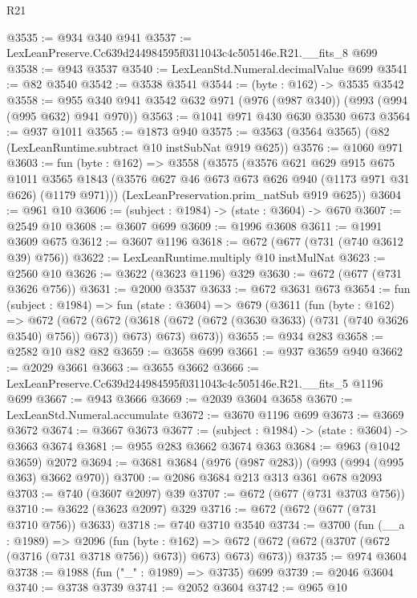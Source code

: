 \begin{lexlean}{R21}
\begin{coremodule}
@3535 := @934 @340 @941
@3537 := LexLeanPreserve.Cc639d244984595f0311043c4c505146e.R21.__fits_8 @699
@3538 := @943 @3537
@3540 := LexLeanStd.Numeral.decimalValue @699
@3541 := @82 @3540
@3542 := @3538 @3541
@3544 := (byte : @162) -> @3535 @3542
@3558 := @955 @340 @941 @3542 @632 @971 (@976 (@987 @340)) (@993 (@994 (@995 @632) @941 @970))
@3563 := @1041 @971 @430 @630 @3530 @673
@3564 := @937 @1011
@3565 := @1873 @940
@3575 := @3563 (@3564 @3565) (@82 (LexLeanRuntime.subtract @10 instSubNat @919 @625))
@3576 := @1060 @971
@3603 := fun (byte : @162) =>
  @3558
    (@3575
      (@3576
        @621
        @629
        @915
        @675
        @1011
        @3565
        @1843
        (@3576 @627 @46 @673 @673 @626 @940 (@1173 @971 @31 @626) (@1179 @971)))
      (LexLeanPreservation.prim_natSub @919 @625))
@3604 := @961 @10
@3606 := (subject : @1984) -> (state : @3604) -> @670
@3607 := @2549 @10
@3608 := @3607 @699
@3609 := @1996 @3608
@3611 := @1991 @3609 @675
@3612 := @3607 @1196
@3618 := @672 (@677 (@731 (@740 @3612 @39) @756))
@3622 := LexLeanRuntime.multiply @10 instMulNat
@3623 := @2560 @10
@3626 := @3622 (@3623 @1196) @329
@3630 := @672 (@677 (@731 @3626 @756))
@3631 := @2000 @3537
@3633 := @672 @3631 @673
@3654 := fun (subject : @1984) =>
  fun (state : @3604) =>
  @679
    (@3611
      (fun (byte : @162) =>
      @672
        (@672
          (@672 (@3618 (@672 (@672 (@3630 @3633) (@731 (@740 @3626 @3540) @756)) @673)) @673)
          @673)
        @673))
@3655 := @934 @283
@3658 := @2582 @10 @82 @82
@3659 := @3658 @699
@3661 := @937 @3659 @940
@3662 := @2029 @3661
@3663 := @3655 @3662
@3666 := LexLeanPreserve.Cc639d244984595f0311043c4c505146e.R21.__fits_5 @1196 @699
@3667 := @943 @3666
@3669 := @2039 @3604 @3658
@3670 := LexLeanStd.Numeral.accumulate
@3672 := @3670 @1196 @699
@3673 := @3669 @3672
@3674 := @3667 @3673
@3677 := (subject : @1984) -> (state : @3604) -> @3663 @3674
@3681 := @955 @283 @3662 @3674 @363
@3684 := @963 (@1042 @3659) @2072
@3694 := @3681 @3684 (@976 (@987 @283)) (@993 (@994 (@995 @363) @3662 @970))
@3700 := @2086 @3684 @213 @313 @361 @678 @2093
@3703 := @740 (@3607 @2097) @39
@3707 := @672 (@677 (@731 @3703 @756))
@3710 := @3622 (@3623 @2097) @329
@3716 := @672 (@672 (@677 (@731 @3710 @756)) @3633)
@3718 := @740 @3710 @3540
@3734 := @3700
    (fun (__a : @1989) =>
    @2096
      (fun (byte : @162) =>
      @672 (@672 (@672 (@3707 (@672 (@3716 (@731 @3718 @756)) @673)) @673) @673) @673))
@3735 := @974 @3604
@3738 := @1988 (fun ("_" : @1989) => @3735) @699
@3739 := @2046 @3604
@3740 := @3738 @3739
@3741 := @2052 @3604
@3742 := @965 @10

\end{coremodule}
\end{lexlean}
